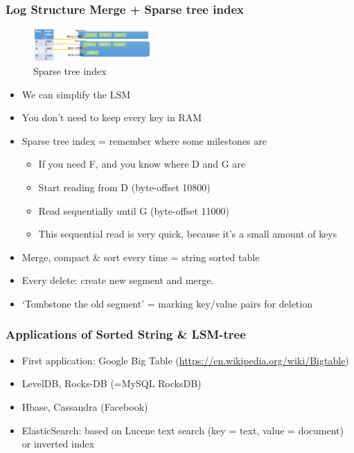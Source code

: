 \documentclass{article}
\begin{document}
\subsubsection{Log Structure Merge + Sparse tree index}

\begin{figure}[H]
    \centering
    \includegraphics[width=0.4\textwidth]{lsm-sparse-tree-index.png}
    \caption{Sparse tree index}
\end{figure}


\begin{itemize}
    \item We can simplify the LSM
    \item You don't need to keep every key in RAM
    \item Sparse tree index = remember where some milestones are
    \begin{itemize}
        \item If you need F, and you know where D and G are
        \item Start reading from D (byte-offset 10800)
        \item Read sequentially until G (byte-offset 11000)
        \item This sequential read is very quick, because it's a small amount of keys
    \end{itemize}
    \item Merge, compact \& sort every time = string sorted table
    \item Every delete: create new segment and merge. 
    \item `Tombstone the old segment' = marking key/value pairs for deletion
\end{itemize}

\subsubsection{Applications of Sorted String \& LSM-tree}

\begin{itemize}
    \item First application: Google Big Table (\url{https://en.wikipedia.org/wiki/Bigtable})
    \item LevelDB, Rocks-DB (=MySQL RocksDB)
    \item Hbase, Cassandra (Facebook)
    \item ElasticSearch: based on Lucene text search (key = text, value = document) or inverted index
\end{itemize}
\end{document}
